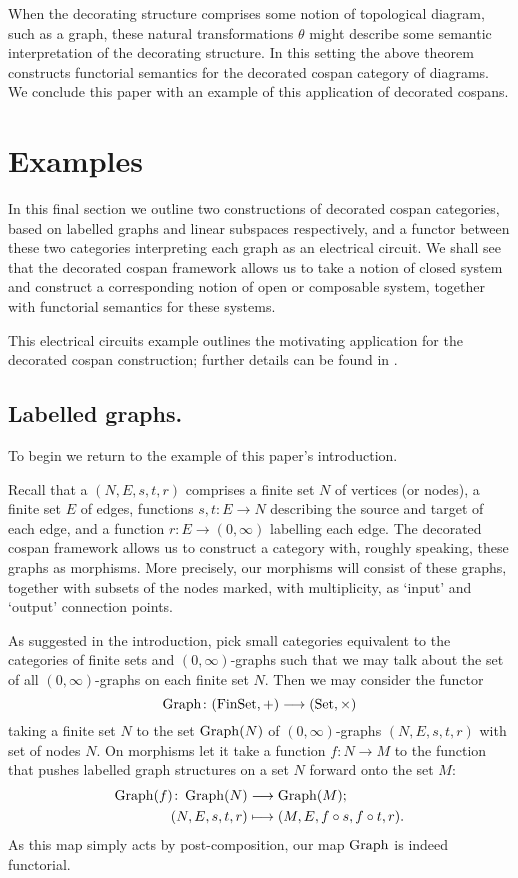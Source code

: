 When the decorating structure comprises some notion of topological diagram, such
as a graph, these natural transformations $\theta$ might describe some semantic
interpretation of the decorating structure. In this setting the above theorem
constructs functorial semantics for the decorated cospan category of diagrams.
We conclude this paper with an example of this application of decorated cospans.

\section{Examples} \label{sec:ex}

In this final section we outline two constructions of decorated cospan
categories, based on labelled graphs and linear subspaces respectively, and a
functor between these two categories interpreting each graph as an electrical
circuit. We shall see that the decorated cospan framework allows us to take a
notion of closed system and construct a corresponding notion of open or
composable system, together with functorial semantics for these systems.

This electrical circuits example outlines the motivating application for the
decorated cospan construction; further details can be found in \cite{BF}.

\subsection{Labelled graphs.}

To begin we return to the example of this paper's introduction. 

Recall that a  $(N,E,s,t,r)$ comprises a finite set
$N$ of vertices (or nodes), a finite set $E$ of edges, functions $s,t\colon  E \to N$
describing the source and target of each edge, and a function $r\colon  E \to
(0,\infty)$ labelling each edge. The decorated cospan framework allows us to
construct a category with, roughly speaking, these graphs as morphisms. More
precisely, our morphisms will consist of these graphs, together with subsets of
the nodes marked, with multiplicity, as `input' and `output' connection points.

As suggested in the introduction, pick small categories equivalent to the
categories of finite sets and $(0,\infty)$-graphs such that we may talk about
the set of all $(0,\infty)$-graphs on each finite set $N$.  Then we may consider
the functor
\[
  \operatorname{Graph}\colon  (\mathrm{FinSet},+) \longrightarrow (\mathrm{Set},\times)
\]
taking a finite set $N$ to the set $\operatorname{Graph}(N)$ of $(0,\infty)$-graphs
$(N,E,s,t,r)$ with set of nodes $N$. On
morphisms let it take a function $f\colon N \to M$ to the function that pushes
labelled graph structures on a set $N$ forward onto the set $M$:
\begin{align*}
  \operatorname{Graph}(f)\colon  \operatorname{Graph}(N) &\longrightarrow
  \operatorname{Graph}(M); \\
  (N,E,s,t,r) &\longmapsto (M,E,f \circ s, f \circ t, r).
\end{align*}
As this map simply acts by post-composition, our map $\operatorname{Graph}$ is indeed
functorial.

